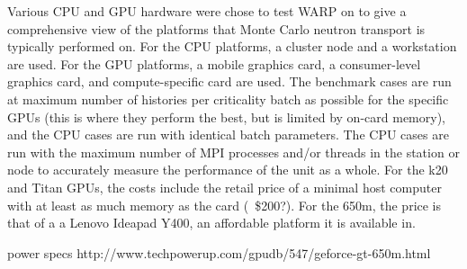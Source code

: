 \documentclass[preprint,12pt]{elsarticle}
\begin{document}
Various CPU and GPU hardware were chose to test WARP on to give a comprehensive view of the platforms that Monte Carlo neutron transport is typically performed on.  For the CPU platforms, a cluster node and a workstation are used.  For the GPU platforms, a mobile graphics card, a consumer-level graphics card, and compute-specific card are used. The benchmark cases are run at maximum number of histories per criticality batch as possible for the specific GPUs (this is where they perform the best, but is limited by on-card memory), and the CPU cases are run with identical batch parameters.  The CPU cases are run with the maximum number of MPI processes and/or threads in the station or node to accurately measure the performance of the unit as a whole. For the k20 and Titan GPUs, the costs include the retail price of a minimal host computer with at least as much memory as the card (~\$200?).  For the 650m, the price is that of a a Lenovo Ideapad Y400, an affordable platform it is available in. 

power specs http://www.techpowerup.com/gpudb/547/geforce-gt-650m.html
\end{document}
